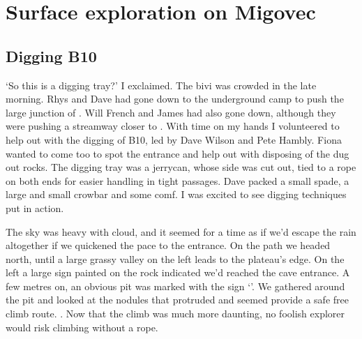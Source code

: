 \begin{marginfigure}
\end{marginfigure}
\section{Surface exploration on Migovec}
\subsection{Digging B10}
`So this is a digging tray?' I exclaimed. The bivi was crowded in the late morning. Rhys and Dave had gone down to the underground camp to push the large junction of . Will French and James had also gone down, although they were pushing a streamway closer to . With time on my hands I volunteered to help out with the digging of B10, led by Dave Wilson and Pete Hambly. Fiona wanted to come too to spot the entrance and help out with disposing of the dug out rocks. The digging tray was a jerrycan, whose side was cut out, tied to a rope on both ends for easier handling in tight passages. Dave packed a small spade, a large and small crowbar and some comf. I was excited to see digging techniques put in action.

The sky was heavy with cloud, and it seemed for a time as if we'd escape the rain altogether if we quickened the pace to the entrance. On the  path we headed north, until a large grassy valley on the left leads to the plateau's edge. On the left a large sign painted on the rock indicated we'd reached the cave entrance. A few metres on, an obvious pit was marked with the sign `'.  We gathered around the pit and looked at the nodules that protruded and seemed provide a safe free climb route. . Now that the climb was much more daunting, no foolish explorer would risk climbing without a rope.

